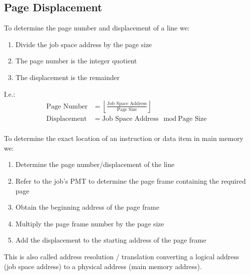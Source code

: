 \documentclass[12pt letter]{report}
\begin{document}
\subsection{Page Displacement}




To determine the page number and displacement of a line we:
\begin{enumerate}
  \item Divide the job space address by the page size
  \item The page number is the integer quotient
  \item The displacement is the remainder
\end{enumerate}
I.e.:
\begin{align*}
  \text{Page Number}  & = \left\lfloor \frac{\text{Job Space Address}}{\text{Page Size}} \right\rfloor \\
  \text{Displacement} & = \text{Job Space Address} \mod \text{Page Size}                               \\
\end{align*}


To determine the exact location of an instruction or data item in main memory we:
\begin{enumerate}
  \item Determine the page number/displacement of the line
  \item Refer to the job's PMT to determine the page frame containing the required page
  \item Obtain the beginning address of the page frame
  \item Multiply the page frame number by the page size
  \item Add the displacement to the starting address of the page frame
\end{enumerate}
This is also called address resolution / translation converting a logical address (job space address) to a physical address (main memory address).
\end{document}
